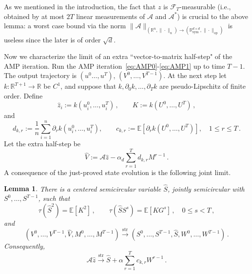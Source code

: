\documentclass[11pt]{article}
\newtheorem{lemma}[theorem]{Lemma}
\theoremstyle{definition}
\theoremstyle{remark}
\numberwithin{equation}{section}
\numberwithin{theorem}{section}
\newcommand{\R}{\mathbb R}
\newcommand{\E}{\mathbb E}
\newcommand{\op}{\mathrm{op}}
\newcommand{\taup}{\tau}
\newcommand{\cA}{\mathcal A}
\newcommand{\Symm}{\mathbb{R}^{d \times d}_{\mathrm{sym}}}
\begin{document}
As we mentioned in the introduction, the fact that $z$ is $\mathscr F_T$-measurable (i.e., obtained by at most $2T$ linear measurements of $\cA$ and $\cA^*$) is crucial to the above lemma: a worst case bound via the norm $\|\cA\|_{(\R^n,\|\cdot\|_n)\to(\Symm,\|\cdot\|_{\op})}$ is useless since the later is of order $\sqrt d$.
    
Now we characterize the limit of an extra ``vector-to-matrix half-step" of the AMP iteration. 
Run the AMP iteration~\eqref{eq:AMP0}-\eqref{eq:AMP1} up to time $T-1$. The output trajectory is $(u^0\ldots,u^T)$, $(V^0,\ldots,V^{T-1})$.
 At the next step let $k:\R^{T+1}\to\R$ be $C^1$, and suppose that
$k,\partial_0k,\ldots,\partial_Tk$ are pseudo-Lipschitz of finite
order.  Define
\[
 \widehat z_i:=k(u_i^0,\ldots,u_i^T)\,,
 \qquad
 K:=k(U^0,\ldots,U^T)\,,
\]
and
\[
 d_{k,r}:=\frac1n\sum_{i=1}^n
 \partial_rk(u_i^0,\ldots,u_i^T),
 \qquad
 c_{k,r}:=\E[\partial_rk(U^0,\ldots,U^T)],
 \quad 1\le r\le T\,.
\]
Let the extra half-step be
\begin{equation}\label{eq:extra-half-step}
 \widehat{V}:=
 \cA \widehat z - \alpha_d\sum_{r=1}^T d_{k,r}M^{r-1}\,.
\end{equation}
%
A consequence of the just-proved state evolution is the following joint limit. 
\begin{lemma}
\label{lem:smooth-terminal-half-step}
There is a centered semicircular variable $\widehat S$, jointly
semicircular with $S^0,\ldots,S^{T-1}$, such that
\[
 \taup(\widehat S^2)=\E[K^2]\,,
 \qquad
 \taup(\widehat S S^s)=\E[KG^s]\,,
 \quad 0\le s<T\,,
\]
and
\[
 (V^0,\ldots,V^{T-1},\widehat V,M^0,\ldots,M^{T-1})
 \xrightarrow{\mathrm{str}}
 (S^0,\ldots,S^{T-1},\widehat S, W^0,\ldots,W^{T-1})\,.
\]
Consequently,
\begin{equation}\label{eq:smooth-terminal-strong-limit}
 \cA \widehat z
 \xrightarrow{\mathrm{str}}
 \widehat S + \alpha\sum_{r=1}^T c_{k,r}W^{r-1}\,.
\end{equation}
\end{lemma}
\end{document}

